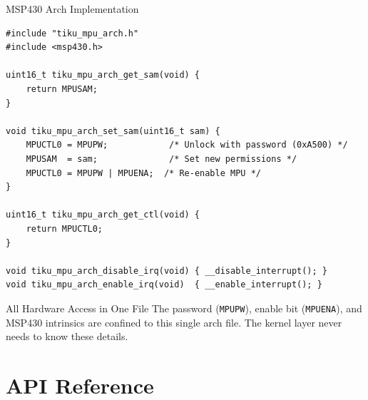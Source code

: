 \documentclass[aspectratio=169, 10pt]{beamer}
\begin{document}
\begin{frame}[fragile]{MSP430 Arch Implementation}
\begin{lstlisting}[style=cstyle, title={arch/msp430/tiku\_mpu\_arch.c}]
#include "tiku_mpu_arch.h"
#include <msp430.h>

uint16_t tiku_mpu_arch_get_sam(void) {
    return MPUSAM;
}

void tiku_mpu_arch_set_sam(uint16_t sam) {
    MPUCTL0 = MPUPW;            /* Unlock with password (0xA500) */
    MPUSAM  = sam;              /* Set new permissions */
    MPUCTL0 = MPUPW | MPUENA;  /* Re-enable MPU */
}

uint16_t tiku_mpu_arch_get_ctl(void) {
    return MPUCTL0;
}

void tiku_mpu_arch_disable_irq(void) { __disable_interrupt(); }
void tiku_mpu_arch_enable_irq(void)  { __enable_interrupt(); }
\end{lstlisting}

\vspace{0.3em}
\begin{alertblock}{All Hardware Access in One File}
The password (\texttt{MPUPW}), enable bit (\texttt{MPUENA}), and
MSP430 intrinsics are confined to this single arch file. The kernel
layer never needs to know these details.
\end{alertblock}
\end{frame}

\section{API Reference}
\end{document}
